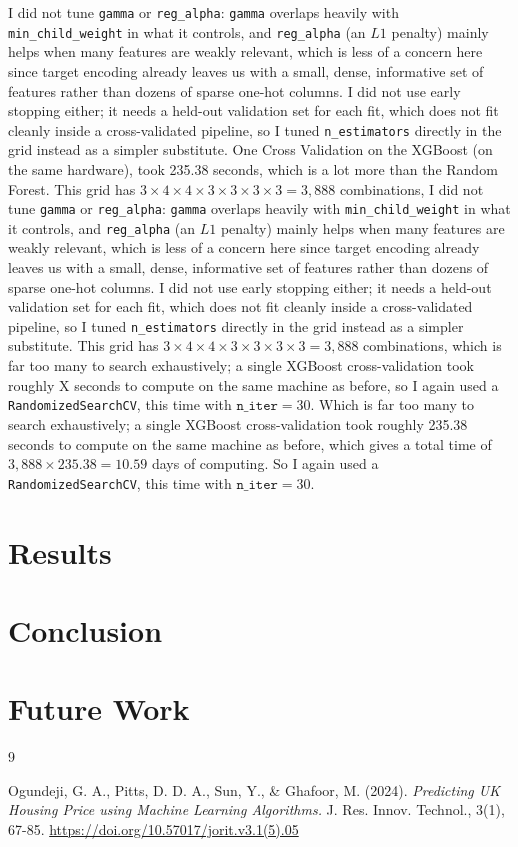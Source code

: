 \documentclass[14pt]{article}
\begin{document}
	I did not tune \texttt{gamma} or \texttt{reg\_alpha}: \texttt{gamma} overlaps heavily with \texttt{min\_child\_weight} in what it controls, and \texttt{reg\_alpha} (an $L1$ penalty) mainly helps when many features are weakly relevant, which is less of a concern here since target encoding already leaves us with a small, dense, informative set of features rather than dozens of sparse one-hot columns.
	I did not use early stopping either; it needs a held-out validation set for each fit, which does not fit cleanly inside a cross-validated pipeline, so I tuned \texttt{n\_estimators} directly in the grid instead as a simpler substitute.
	One Cross Validation on the XGBoost (on the same hardware), took 235.38 seconds, which is a lot more than the Random Forest.
	This grid has $3\times4\times4\times3\times3\times3\times3 = 3{,}888$ combinations,
	I did not tune \texttt{gamma} or \texttt{reg\_alpha}: \texttt{gamma} overlaps heavily with \texttt{min\_child\_weight} in what it controls, and \texttt{reg\_alpha} (an $L1$ penalty) mainly helps when many features are weakly relevant, which is less of a concern here since target encoding already leaves us with a small, dense, informative set of features rather than dozens of sparse one-hot columns.
	I did not use early stopping either; it needs a held-out validation set for each fit, which does not fit cleanly inside a cross-validated pipeline, so I tuned \texttt{n\_estimators} directly in the grid instead as a simpler substitute.
	This grid has $3\times4\times4\times3\times3\times3\times3 = 3{,}888$ combinations, which is far too many to search exhaustively; a single XGBoost cross-validation took roughly X seconds to compute on the same machine as before, so I again used a \texttt{RandomizedSearchCV}, this time with $\texttt{n\_iter}=30$.
	Which is far too many to search exhaustively; a single XGBoost cross-validation took roughly 235.38 seconds to compute on the same machine as before, which gives a total time of $3{,}888 \times 235.38 = 10.59$ days of computing. So I again used a \texttt{RandomizedSearchCV}, this time with $\texttt{n\_iter}=30$.




\section{Results}
\section{Conclusion}
\section{Future Work}
\begin{thebibliography}{9}

	Ogundeji, G. A., Pitts, D. D. A., Sun, Y., \& Ghafoor, M. (2024). \emph{Predicting UK Housing Price using Machine Learning Algorithms.} J. Res. Innov. Technol., 3(1), 67-85. \textcolor{RoyalBlue}{\url{https://doi.org/10.57017/jorit.v3.1(5).05}}
\end{thebibliography}
\end{document}
